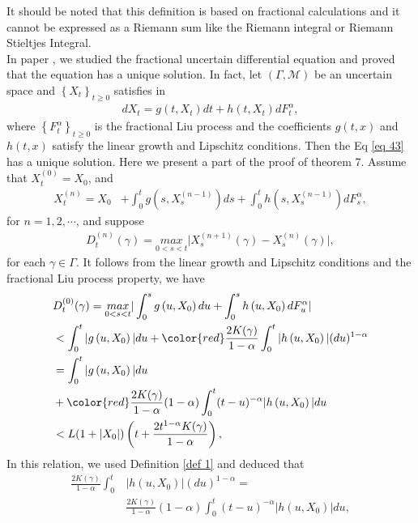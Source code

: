 \documentclass[a4paper,fleqn]{cas-dc}
\begin{document}
	It should be noted that this definition is based on fractional calculations and it cannot be expressed as a Riemann sum like the Riemann integral or Riemann Stieltjes Integral. 
	\\
	In paper \cite{bib 2}, we studied  the  fractional uncertain differential equation and proved that the equation has a unique solution. In fact, let $(\Gamma, \mathcal{M})$ be an uncertain space and  $\left\lbrace X_t \right\rbrace_{t \geq 0}$ satisfies in  
	\begin{align}\label{eq 43}
		dX_t = g(t, X_t) dt + h(t, X_t) dF_t^{\alpha},
	\end{align}  
	where $\left\lbrace F_t^{\alpha} \right\rbrace_{t \geq 0}$ is the fractional Liu process and   the coefficients $g(t, x)$ and $h(t, x)$ satisfy the linear growth and Lipschitz  conditions. Then the Eq \eqref{eq 43} has a unique solution. Here we present a part of the proof of theorem 7.  Assume that  $X_t^{(0)} = X_0$, and 
	\begin{align}
		X_t^{(n)} = X_0 &+ \int_0^t g\left( s, X_s^{(n-1)}\right) ds + \int_0^t h\left( s, X_s^{(n-1)}\right) dF_s^{\alpha},
	\end{align}
	for $n =1, 2, \cdots$, and suppose 
	\begin{align}
		D_t^{(n)}(\gamma) = \underset{0 < s < t}{max} \vert X_s^{(n+1)} (\gamma) - X_s^{(n)} (\gamma) \vert, 
	\end{align}
	for each $\gamma \in \Gamma$. It follows from the linear growth  and Lipschitz conditions and the fractional Liu process property, we have
	\begin{align}
	&	D_t^{(0)}(\gamma)  = \underset{0 < s < t}{max} \vert \int_0^s g\left(u, X_0\right) du + \int_0^s h\left(u, X_0\right) dF_u^{\alpha} \vert \nonumber \\
		& <  \int_0^t \vert g\left(u, X_0\right) \vert  du  +{\color{red} \frac{2 K(\gamma)}{1 - \alpha}\int_0^t \vert h\left(u, X_0\right) \vert  (du)^{1-\alpha}} \nonumber \\ 
		& = \int_0^t \vert g\left(u, X_0\right) \vert  du \nonumber \\ 
		&  + {\color{red}\frac{2 K(\gamma)}{1 - \alpha}(1-\alpha)\int_0^t (t - u)^{-\alpha} \vert h\left(u, X_0\right) \vert du} \nonumber \\
		& < L(1+|X_0|) \left(t + \frac{2 t^{1-\alpha} K(\gamma)}{1-\alpha}\right),
	\end{align}
	In this relation, we used Definition \ref{def 1} and  deduced that 
	\begin{align}\label{eq 26}
		\frac{2 K(\gamma)}{1 - \alpha}\int_0^t& \vert h\left(u, X_0\right) \vert   (du)^{1-\alpha} = \nonumber \\
		& \frac{2 K(\gamma)}{1 - \alpha}(1-\alpha)\int_0^t (t - u)^{-\alpha} \vert h\left(u, X_0\right) \vert du, 
	\end{align}
\end{document}

